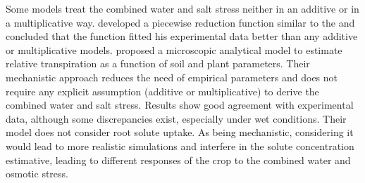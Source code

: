 Some models treat the combined water and salt stress neither in an additive or in a multiplicative way. \citeonline[homaee] developed a piecewise reduction function similar to the \citeonline[feddes78] and concluded that the function fitted his experimental data better than any additive or multiplicative models.
\citeonline[liersolute] proposed a microscopic analytical model to estimate relative transpiration as a function of soil and plant parameters. 
Their mechanistic approach reduces the need of empirical parameters and does not require any explicit assumption (additive or multiplicative) to derive the combined water and salt stress. 
Results show good agreement with experimental data, although some discrepancies exist, especially under wet conditions. 
Their model does not consider root solute uptake.
As being mechanistic, considering it would lead to more realistic simulations and interfere in the solute concentration estimative, leading to different responses of the crop to the combined water and osmotic stress.






